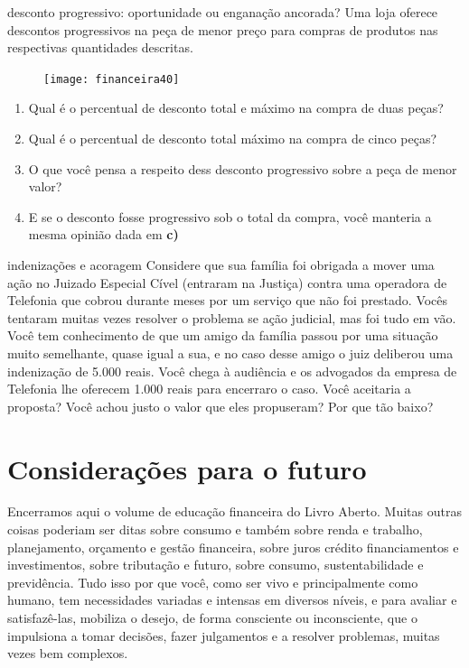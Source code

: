 \begin{task}{desconto progressivo: oportunidade ou enganação ancorada?}
\label{fin-ativ-40}
Uma loja oferece descontos progressivos na peça de menor preço para compras de produtos nas respectivas quantidades descritas.

\begin{figure}[H]
\centering

\texttt{[image: financeira40]}
\end{figure}

\begin{enumerate}
\item Qual é o percentual de desconto total e máximo na compra de duas peças?
\item Qual é o percentual de desconto total máximo na compra de cinco peças?
\item O que você pensa a respeito dess desconto progressivo sobre a peça de menor valor?
\item E se o desconto fosse progressivo sob o total da compra, você manteria a mesma opinião dada em \textcolor{\currentcolor}{\textbf{c)}}
\end{enumerate}
\end{task}





\begin{task}{indenizações e acoragem}
\label{fin-ativ-41}
Considere que sua família foi obrigada a mover uma ação no Juizado Especial Cível (entraram na Justiça) contra uma operadora de Telefonia que cobrou durante meses por um serviço que não foi prestado. Vocês tentaram muitas vezes resolver o problema se ação judicial, mas foi tudo em vão. Você tem conhecimento de que um amigo da família passou por uma situação muito semelhante, quase igual a sua, e no caso desse amigo o juiz deliberou uma indenização de 5.000 reais. Você chega à audiência e os advogados da empresa de Telefonia lhe oferecem 1.000 reais para encerraro o caso. Você aceitaria a proposta? Você achou justo o valor que eles propuseram? Por que tão baixo?
\end{task}

\clearpage

\def\currentcolor{session1}
\section{Considerações para o futuro}
Encerramos aqui o volume de educação financeira do Livro Aberto.
Muitas outras coisas poderiam ser ditas sobre consumo e também sobre renda e trabalho, planejamento, orçamento e gestão financeira, sobre juros crédito financiamentos e investimentos, sobre tributação e futuro, sobre consumo, sustentabilidade e previdência. Tudo isso por que você, como ser vivo e principalmente como humano, tem necessidades variadas e intensas em diversos níveis, e para avaliar e satisfazê-las, mobiliza o desejo, de forma consciente ou inconsciente, que o impulsiona a tomar decisões, fazer julgamentos e a resolver problemas, muitas vezes bem complexos. 

